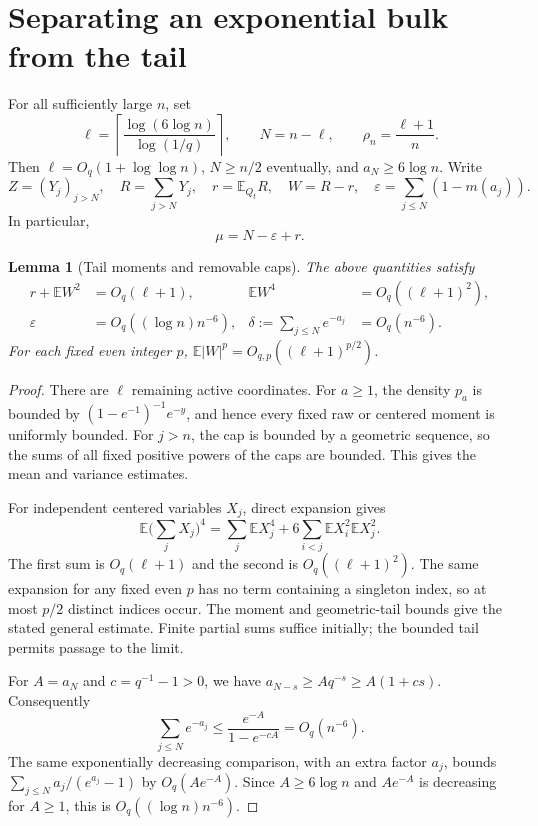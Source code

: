 \documentclass[11pt,letterpaper]{article}
\numberwithin{equation}{section}
\newtheorem{lemma}[theorem]{Lemma}
\theoremstyle{definition}
\theoremstyle{remark}
\newcommand{\EE}{\mathbb E}
\newcommand{\eps}{\varepsilon}
\begin{document}
\section{Separating an exponential bulk from the tail}
\label{sec:split}

For all sufficiently large $n$, set
\begin{equation}
 \ell=\left\lceil\frac{\log(6\log n)}{\log(1/q)}\right\rceil,
 \qquad N=n-\ell,\qquad
 \rho_n=\frac{\ell+1}{n}.
 \label{eq:cutoff}
\end{equation}
Then $\ell=O_q(1+\log\log n)$, $N\ge n/2$ eventually, and
$a_N\ge6\log n$. Write
\begin{equation}
 Z=(Y_j)_{j>N},\quad R=\sum_{j>N}Y_j,\quad r=\EE_{Q_t}R,\quad
 W=R-r,\quad
 \eps=\sum_{j\le N}(1-m(a_j)).
 \label{eq:taildef}
\end{equation}
In particular,
\begin{equation}
 \mu=N-\eps+r.
 \label{eq:muexact}
\end{equation}

\begin{lemma}[Tail moments and removable caps]
\label{lem:tail}
The above quantities satisfy
\begin{align}
 r+\EE W^2&=O_q(\ell+1),&
 \EE W^4&=O_q((\ell+1)^2), \label{eq:tailmoments}\\
 \eps&=O_q((\log n)n^{-6}),&
 \delta:=\sum_{j\le N}e^{-a_j}&=O_q(n^{-6}).
 \label{eq:caperror}
\end{align}
For each fixed even integer $p$, $\EE|W|^p=O_{q,p}((\ell+1)^{p/2})$.
\end{lemma}
\begin{proof}
There are $\ell$ remaining active coordinates. For $a\ge1$, the density
$p_a$ is bounded by $(1-e^{-1})^{-1}e^{-y}$, and hence every fixed raw or
centered moment is uniformly bounded. For $j>n$, the cap is bounded by a
geometric sequence, so the sums of all fixed positive powers of the caps
are bounded. This gives the mean and variance estimates.

For independent centered variables $X_j$, direct expansion gives
\[
 \EE\Big(\sum_jX_j\Big)^4
 =\sum_j\EE X_j^4+6\sum_{i<j}\EE X_i^2\EE X_j^2.
\]
The first sum is $O_q(\ell+1)$ and the second is $O_q((\ell+1)^2)$.
The same expansion for any fixed even $p$ has no term containing a singleton
index, so at most $p/2$ distinct indices occur. The moment and geometric-tail
bounds give the stated general estimate. Finite partial sums suffice initially;
the bounded tail permits passage to the limit.

For $A=a_N$ and $c=q^{-1}-1>0$, we have
$a_{N-s}\ge Aq^{-s}\ge A(1+cs)$. Consequently
\[
 \sum_{j\le N}e^{-a_j}
 \le\frac{e^{-A}}{1-e^{-cA}}=O_q(n^{-6}).
\]
The same exponentially decreasing comparison, with an extra factor $a_j$,
bounds $\sum_{j\le N}a_j/(e^{a_j}-1)$ by $O_q(Ae^{-A})$.
Since $A\ge6\log n$ and $Ae^{-A}$ is decreasing for $A\ge1$, this is
$O_q((\log n)n^{-6})$.
\end{proof}
\end{document}
